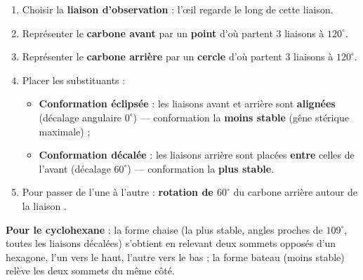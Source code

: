 \documentclass[11pt]{article}
\newcommand{\cle}[1]{{\popxbold\color{popdark}#1}}
\begin{document}
\begin{methode}
\begin{enumerate}
\item Choisir la \textbf{liaison  d'observation} : l'œil regarde le long de cette liaison.
\item Représenter le \textbf{carbone avant} par un \textbf{point} d'où partent 3 liaisons à $120^\circ$.
\item Représenter le \textbf{carbone arrière} par un \textbf{cercle} d'où partent 3 liaisons à $120^\circ$.
\item Placer les substituants :
\begin{itemize}
\item \textbf{Conformation éclipsée} : les liaisons avant et arrière sont \textbf{alignées} (décalage angulaire $0^\circ$) — conformation la \textbf{moins stable} (gêne stérique maximale) ;
\item \textbf{Conformation décalée} : les liaisons arrière sont placées \textbf{entre} celles de l'avant (décalage $60^\circ$) — conformation la \textbf{plus stable}.
\end{itemize}
\item Pour passer de l'une à l'autre : \textbf{rotation de $60^\circ$} du carbone arrière autour de la liaison .
\end{enumerate}
\textbf{Pour le cyclohexane} : la forme \cle{chaise} (la plus stable, angles proches de $109^\circ$, toutes les liaisons décalées) s'obtient en relevant deux sommets opposés d'un hexagone, l'un vers le haut, l'autre vers le bas ; la forme \cle{bateau} (moins stable) relève les deux sommets du même côté.
\end{methode}
\end{document}
